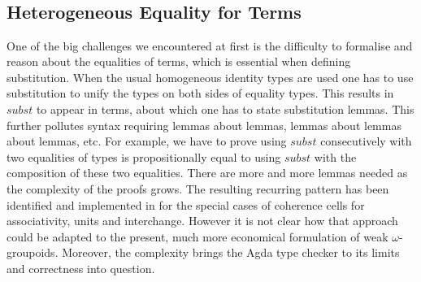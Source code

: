 \documentclass{sig-alternate}
\newcommand{\wog}{weak $\omega$-groupoids}
\begin{document}
\begin{code}\>\<%
\\
\>   \<%
\\
\>[0]\<[2]%
\>[2]\AgdaInductiveConstructor{*} \<[8]%
\>[8]\AgdaSymbol{:}  \<%
\\
\>[0]\<[2]%
\>[2] \<[8]%
\>[8]\AgdaSymbol{:} \AgdaSymbol{\{} \AgdaSymbol{:}  \AgdaSymbol{\}(}  \AgdaSymbol{:}  \AgdaSymbol{)}   \<%
\\
\>\<\end{code}

\subsection{Heterogeneous Equality for Terms}

One of the big challenges we encountered at first is the difficulty to
formalise and reason about the equalities of terms, which is
essential when defining substitution. When the usual homogeneous identity types
are used one has to use substitution to unify
the types on both sides of equality types. This results in
$\mathit{subst}$ to appear in terms, about which one has to state
substitution lemmas. This further pollutes syntax requiring lemmas
about lemmas, lemmas about lemmas about lemmas, etc. For example, we have to prove using $\mathit{subst}$ consecutively with two equalities of types is propositionally equal to using $\mathit{subst}$ with the composition of these two equalities. There are more and more lemmas needed as the complexity of the proofs grows. The resulting
recurring pattern has been identified and implemented in
\cite{txa:csl} for the special cases of coherence cells for
associativity, units and interchange. However it is not clear how that
approach could be adapted to the present, much more economical
formulation of {\wog}. Moreover, the complexity brings the
Agda type checker to its limits and correctness into question.
\end{document}
